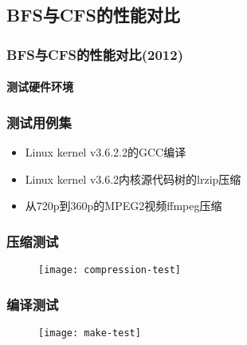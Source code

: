 \subsection{BFS与CFS的性能对比} %
\begin{frame}[fragile]
    \frametitle{BFS与CFS的性能对比(2012)}
    \framesubtitle{测试硬件环境}
    \begin{figure}
    \end{figure}

\end{frame}
% 
% 
\begin{frame}[fragile]
    \frametitle{测试用例集}
    \begin{itemize}
        \item Linux kernel v3.6.2.2的GCC编译
        \item Linux kernel v3.6.2内核源代码树的lrzip压缩
        \item 从720p到360p的MPEG2视频ffmpeg压缩
        \end{itemize}
\end{frame}
% 
% 
% 
\begin{frame}[fragile]
    \frametitle{压缩测试}
    \begin{figure}
    \texttt{[image: compression-test]}
    \end{figure}

\end{frame}
% 
% 
\begin{frame}[fragile]
    \frametitle{编译测试}
    \begin{figure}
    \texttt{[image: make-test]}
    \end{figure}

\end{frame}
